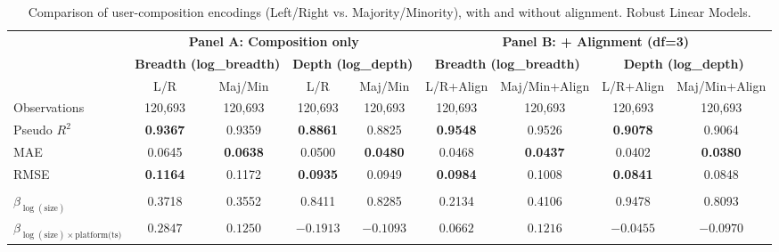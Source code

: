 \documentclass[letterpaper]{article} %
\newcommand{\rev}[1]{{\color{blue}#1}}
\begin{document}
\begin{table}[!t]
\centering
\caption{Comparison of user-composition encodings (Left/Right vs. Majority/Minority), with and without alignment. Robust Linear Models.}
\label{tab:si_comp_encoding_rlm_full}
\scriptsize
\renewcommand{\arraystretch}{1.25}
\setlength{\tabcolsep}{3pt}

\begin{tabular}{lcccccccc}
\hline
& \multicolumn{4}{c}{\textbf{Panel A: Composition only}} & \multicolumn{4}{c}{\textbf{Panel B: + Alignment (df=3)}}\\
\cline{2-9}
& \multicolumn{2}{c}{\textbf{Breadth (log\_breadth)}} & \multicolumn{2}{c}{\textbf{Depth (log\_depth)}} & \multicolumn{2}{c}{\textbf{Breadth (log\_breadth)}} & \multicolumn{2}{c}{\textbf{Depth (log\_depth)}}\\
\cline{2-9}
& L/R & Maj/Min & L/R & Maj/Min & L/R+Align & Maj/Min+Align & L/R+Align & Maj/Min+Align \\
\hline
\rev{Observations} & \rev{120{,}693} & \rev{120{,}693} & \rev{120{,}693} & \rev{120{,}693} & \rev{120{,}693} & \rev{120{,}693} & \rev{120{,}693} & \rev{120{,}693} \\
\rev{Pseudo $R^{2}$} & \rev{\textbf{0.9367}} & \rev{0.9359} & \rev{\textbf{0.8861}} & \rev{0.8825} & \rev{\textbf{0.9548}} & \rev{0.9526} & \rev{\textbf{0.9078}} & \rev{0.9064} \\
\rev{MAE} & \rev{0.0645} & \rev{\textbf{0.0638}} & \rev{0.0500} & \rev{\textbf{0.0480}} & \rev{0.0468} & \rev{\textbf{0.0437}} & \rev{0.0402} & \rev{\textbf{0.0380}} \\
\rev{RMSE} & \rev{\textbf{0.1164}} & \rev{0.1172} & \rev{\textbf{0.0935}} & \rev{0.0949} & \rev{\textbf{0.0984}} & \rev{0.1008} & \rev{\textbf{0.0841}} & \rev{0.0848} \\
\\
$\beta_{\log(\text{size})}$
& \rev{0.3718} & \rev{0.3552} & \rev{0.8411} & \rev{0.8285} & \rev{0.2134} & \rev{0.4106} & \rev{0.9478} & \rev{0.8093} \\
$\beta_{\log(\text{size})\times \text{platform(ts)}}$
& \rev{$0.2847$} & \rev{$0.1250$} & \rev{$-0.1913$} & \rev{$-0.1093$} & \rev{$0.0662$} & \rev{$0.1216$} & \rev{$-0.0455$} & \rev{$-0.0970$} \\
\hline
\end{tabular}



\end{table}
\end{document}
